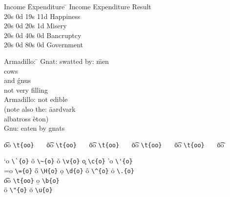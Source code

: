 ﻿\documentclass{article}
\begin{document}
\begin{table}
\begin{center}
\begin{tabbing}
Income \=Expenditure \=    \kill
Income \>Expenditure \>Result \\
20s 0d \>19s 11d \>Happiness   \\
20s 0d \>20s 1d  \>Misery    \\
20s 0d \>40s 0d  \>Bancruptcy    \\
20s 0d \>80s 0d  \>Government    \\
\end{tabbing}
\caption{Another easy test case for tabbing environment, should be
three aligned columns}
\end{center}
\end{table}

\begin{table}
\begin{center}
\begin{tabbing}
Armadillo: \=							\kill
Gnat:      \> swatted by: \= men \+\+   \\
                             cows       \\
                      and \' gnus   \-  \\
              not very filling    \-    \\
Armadillo: \> not edible                \\
\pushtabs
(note also the: \= aardvark             \\
                \> albatross \` eton)   \\
\poptabs
Gnu:            \> eaten by  \>    gnats
\end{tabbing}
\caption{Simplest test case for tabbing environment, should be
three aligned columns}
\end{center}
\end{table}

\begin{table}
\centering
\begin{tabbing}
\t{oo} \= \verb|\t{oo}|~~~ \=
\t{oo} \= \verb|\t{oo}|~~~ \=
\t{oo} \= \verb|\t{oo}|~~~ \=
\t{oo} \= \verb|\t{oo}|~~~ \=
\t{oo} \= \verb|\t{oo}|~~~ \=
\t{oo} \=                       \kill

\a`{o} \> \verb|\`{o}|  \> \~{o}  \> \verb|\~{o}|  \> \v{o}  \> \verb|\v{o}| \>
\c{o}  \> \verb|\c{o}|  \> \a'{o} \> \verb|\'{o}|  \\
\a={o} \> \verb|\={o}|  \> \H{o}  \> \verb|\H{o}|  \> \d{o}  \> \verb|\d{o}| \>
\^{o}  \> \verb|\^{o}|  \> \.{o}  \> \verb|\.{o}|  \\
\t{oo} \> \verb|\t{oo}| \> \b{o}  \> \verb|\b{o}|  \\  \"{o} \> \verb|\"{o}| \>
\u{o}  \> \verb|\u{o}|  \\
\end{tabbing}
\caption{A bunch of different types of `o'.  This table may fail with older versions of Word.  Other RTF readers may get the unicode right, but fail with the table formatting.}
\end{table}
\end{document}
